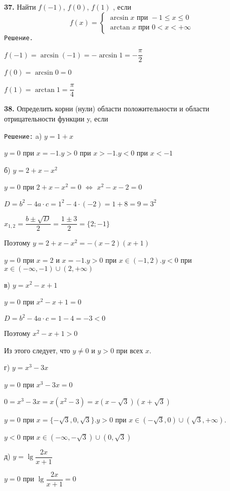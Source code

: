 \documentclass[12pt]{article}
\begin{document}
{\bf 37.} Найти $f(-1)$, $f(0)$, $f(1)$ , если
\begin{equation*}
f(x) = \begin{cases}
	\arcsin x \text{ при } -1\le x\le 0 \\
	\arctan x \text{ при } 0<x<+\infty
\end{cases}
\end{equation*}
	{\tt Решение.}
	
	$f(-1) = \arcsin(-1) = -\arcsin 1 = -\dfrac{\pi}{2}$
	
	$f(0) = \arcsin 0 = 0$
	
	$f(1) = \arctan 1 = \dfrac{\pi}{4}$ 
	\vspace{2mm}
	
	{\bf 38.} Определить корни (нули) области положительности и области отрицательности функции y, если
	
	{\tt Решение:} a) $y=1+x$
	
	$y=0$ при $x=-1$.\quad $y>0$ при $x>-1$.\quad $y<0$ при $x<-1$
	
	\quad б) $y=2+x-x^2$
	
	$y=0$ при $2+x-x^2=0$ $\Leftrightarrow$ $x^2-x-2=0$
	
	\qquad $D = b^2-4a\cdot c = 1^2-4\cdot(-2) = 1+8 = 9 = 3^2$
	
	$x_{1,2} = \dfrac{b \pm \sqrt{D}}{2} = \dfrac{1 \pm 3}{2} = \{2; -1\}$
	
	Поэтому $y=2+x-x^2 = -(x-2)(x+1)$
	
	$y=0$ при $x=2$ и $x=-1$.\quad $y>0$ при $x \in (-1, 2)$.\quad $y<0$ при $x \in (-\infty, -1) \cup (2, +\infty)$
	
	\quad в) $y=x^2-x+1$ 
	
	$y=0$ при $x^2-x+1=0$
	
	\qquad $D = b^2-4a\cdot c = 1 - 4 = -3<0$
	
	Поэтому $x^2-x+1>0$
	
	Из этого следует, что $y \neq 0$ и $y>0$ при всех $x$.
	
	\quad г) $y=x^3-3x$
	
	$y=0$ при $x^3-3x=0$ 
	
	$0=x^3-3x = x(x^2-3)  = x(x-\sqrt{3})(x+\sqrt{3})$
	
	$y=0$ при $x=\{-\sqrt{3},0,\sqrt{3}\}$.\quad $y>0$ при $x\in (-\sqrt{3},0) \cup (\sqrt{3},+\infty)$.
	
	 $y<0$ при $x\in (-\infty, -\sqrt{3})\cup (0,\sqrt{3})$
	
	\quad д) $y=\lg\dfrac{2x}{x+1}$
	
	$y=0$  при $\lg\dfrac{2x}{x+1} = 0$
	
\end{document}
